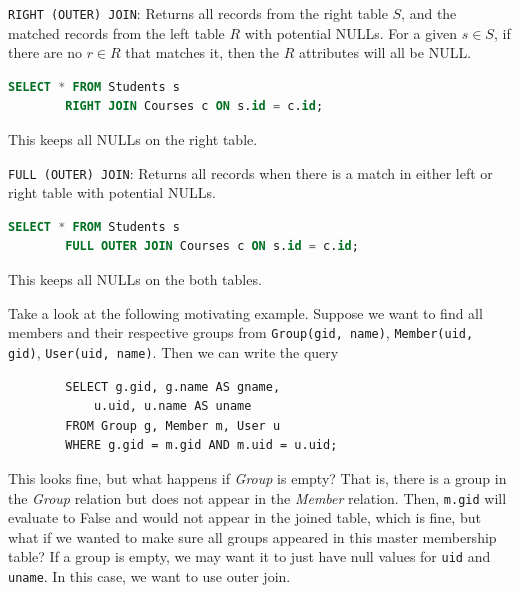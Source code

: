     \begin{definition}
      \texttt{RIGHT (OUTER) JOIN}: Returns all records from the right table $S$, and the matched records from the left table $R$ with potential NULLs. For a given $s \in S$, if there are no $r \in R$ that matches it, then the $R$ attributes will all be NULL. 
      \begin{lstlisting}[language=SQL]
        SELECT * FROM Students s
        RIGHT JOIN Courses c ON s.id = c.id;
      \end{lstlisting}
      This keeps all NULLs on the right table. 
    \end{definition}

    \begin{definition}
      \texttt{FULL (OUTER) JOIN}: Returns all records when there is a match in either left or right table with potential NULLs.
      \begin{lstlisting}[language=SQL]
        SELECT * FROM Students s
        FULL OUTER JOIN Courses c ON s.id = c.id;
      \end{lstlisting}
      This keeps all NULLs on the both tables. 
    \end{definition}

    \begin{example}
      Take a look at the following motivating example. Suppose we want to find all members and their respective groups from \texttt{Group(gid, name)}, \texttt{Member(uid, gid)}, \texttt{User(uid, name)}. Then we can write the query 
      \begin{lstlisting}
        SELECT g.gid, g.name AS gname, 
            u.uid, u.name AS uname 
        FROM Group g, Member m, User u 
        WHERE g.gid = m.gid AND m.uid = u.uid; 
      \end{lstlisting}
      This looks fine, but what happens if \textit{Group} is empty? That is, there is a group in the \textit{Group} relation but does not appear in the \textit{Member} relation. Then, \texttt{m.gid} will evaluate to False and would not appear in the joined table, which is fine, but what if we wanted to make sure all groups appeared in this master membership table? If a group is empty, we may want it to just have null values for \texttt{uid} and \texttt{uname}. In this case, we want to use outer join. 
    \end{example}

